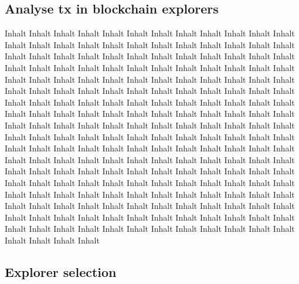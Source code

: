 \documentclass[11pt,a4paper,titlepage]{scrartcl}
\begin{document}
\subsection{Analyse tx in blockchain explorers}
Inhalt Inhalt Inhalt Inhalt Inhalt Inhalt Inhalt Inhalt Inhalt Inhalt Inhalt Inhalt Inhalt Inhalt Inhalt Inhalt Inhalt Inhalt Inhalt Inhalt Inhalt Inhalt Inhalt Inhalt Inhalt Inhalt Inhalt Inhalt Inhalt Inhalt Inhalt Inhalt Inhalt Inhalt Inhalt Inhalt Inhalt Inhalt Inhalt Inhalt Inhalt Inhalt Inhalt Inhalt Inhalt Inhalt Inhalt Inhalt Inhalt Inhalt Inhalt Inhalt Inhalt Inhalt Inhalt Inhalt Inhalt Inhalt Inhalt Inhalt Inhalt Inhalt Inhalt Inhalt Inhalt Inhalt Inhalt Inhalt Inhalt Inhalt Inhalt Inhalt Inhalt Inhalt Inhalt Inhalt Inhalt Inhalt Inhalt Inhalt Inhalt Inhalt Inhalt Inhalt Inhalt Inhalt Inhalt Inhalt Inhalt Inhalt Inhalt Inhalt Inhalt Inhalt Inhalt Inhalt Inhalt Inhalt Inhalt Inhalt Inhalt Inhalt Inhalt Inhalt Inhalt Inhalt Inhalt Inhalt Inhalt Inhalt Inhalt Inhalt Inhalt Inhalt Inhalt Inhalt Inhalt Inhalt Inhalt Inhalt Inhalt Inhalt Inhalt Inhalt Inhalt Inhalt Inhalt Inhalt Inhalt Inhalt Inhalt Inhalt Inhalt Inhalt Inhalt Inhalt Inhalt Inhalt Inhalt Inhalt Inhalt Inhalt Inhalt Inhalt Inhalt Inhalt Inhalt Inhalt Inhalt Inhalt Inhalt Inhalt Inhalt Inhalt Inhalt Inhalt Inhalt Inhalt Inhalt Inhalt Inhalt Inhalt Inhalt Inhalt Inhalt Inhalt Inhalt Inhalt Inhalt Inhalt Inhalt Inhalt Inhalt Inhalt Inhalt Inhalt Inhalt Inhalt Inhalt Inhalt Inhalt Inhalt Inhalt Inhalt Inhalt Inhalt Inhalt Inhalt Inhalt Inhalt Inhalt Inhalt Inhalt Inhalt Inhalt Inhalt Inhalt Inhalt Inhalt Inhalt Inhalt Inhalt Inhalt Inhalt Inhalt Inhalt Inhalt Inhalt Inhalt Inhalt Inhalt Inhalt Inhalt Inhalt Inhalt Inhalt Inhalt Inhalt Inhalt Inhalt  
\subsection{Explorer selection}
\end{document}
